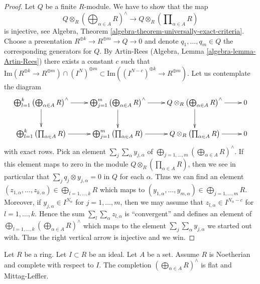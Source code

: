 \begin{proof}
\medskip\noindent
Let $Q$ be a finite $R$-module. We have to show that the map
$$
Q \otimes_R \left(\bigoplus\nolimits_{\alpha \in A} R\right)^\wedge
\longrightarrow
Q \otimes_R \left(\prod\nolimits_{\alpha \in A} R\right)
$$
is injective, see
Algebra, Theorem \ref{algebra-theorem-universally-exact-criteria}.
Choose a presentation $R^{\oplus k} \to R^{\oplus m} \to Q \to 0$
and denote $q_1, \ldots, q_m \in Q$ the corresponding generators for $Q$.
By Artin-Rees
(Algebra, Lemma \ref{algebra-lemma-Artin-Rees})
there exists a constant $c$ such that
$\text{Im}(R^{\oplus k} \to R^{\oplus m}) \cap (I^N)^{\oplus m}
\subset \text{Im}((I^{N - c})^{\oplus k} \to R^{\oplus m})$.
Let us contemplate the diagram
$$
\xymatrix{
\bigoplus_{l = 1}^k \left(\bigoplus\nolimits_{\alpha \in A} R\right)^\wedge
\ar[r] \ar[d] &
\bigoplus_{j = 1}^m \left(\bigoplus\nolimits_{\alpha \in A} R\right)^\wedge
\ar[r] \ar[d] &
Q \otimes_R \left(\bigoplus\nolimits_{\alpha \in A} R\right)^\wedge
\ar[r] \ar[d] &
0 \\
\bigoplus_{l = 1}^k \left(\prod\nolimits_{\alpha \in A} R\right)
\ar[r] &
\bigoplus_{j = 1}^m \left(\prod\nolimits_{\alpha \in A} R\right)
\ar[r] &
Q \otimes_R \left(\prod\nolimits_{\alpha \in A} R\right)
\ar[r] &
0
}
$$
with exact rows. Pick an element $\sum_j \sum_\alpha y_{j, \alpha}$ of
$\bigoplus_{j = 1, \ldots, m}
\left(\bigoplus\nolimits_{\alpha \in A} R\right)^\wedge$.
If this element maps to zero in the module
$Q \otimes_R \left(\prod\nolimits_{\alpha \in A} R\right)$,
then we see in particular that
$\sum_j q_j \otimes y_{j, \alpha} = 0$ in $Q$ for each $\alpha$.
Thus we can find an element
$(z_{1, \alpha}, \ldots, z_{k, \alpha}) \in \bigoplus_{l = 1, \ldots, k} R$
which maps to
$(y_{1, \alpha}, \ldots, y_{m, \alpha}) \in \bigoplus_{j = 1, \ldots, m} R$.
Moreover, if $y_{j, \alpha} \in I^{N_\alpha}$ for $j = 1, \ldots, m$, then
we may assume that $z_{l, \alpha} \in I^{N_\alpha - c}$ for
$l = 1, \ldots, k$.
Hence the sum $\sum_l \sum_\alpha z_{l, \alpha}$ is ``convergent'' and
defines an element of
$\bigoplus_{l = 1, \ldots, k}
\left(\bigoplus\nolimits_{\alpha \in A} R\right)^\wedge$
which maps to the element $\sum_j \sum_\alpha y_{j, \alpha}$ we started
out with. Thus the right vertical arrow is injective and we win.
\end{proof}

\begin{lemma}
\label{lemma-completed-direct-sum-ML}
Let $R$ be a ring. Let $I \subset R$ be an ideal. Let $A$ be a set.
Assume $R$ is Noetherian and complete with respect to $I$. The completion
$\left(\bigoplus\nolimits_{\alpha \in A} R\right)^\wedge$
is flat and Mittag-Leffler.
\end{lemma}

